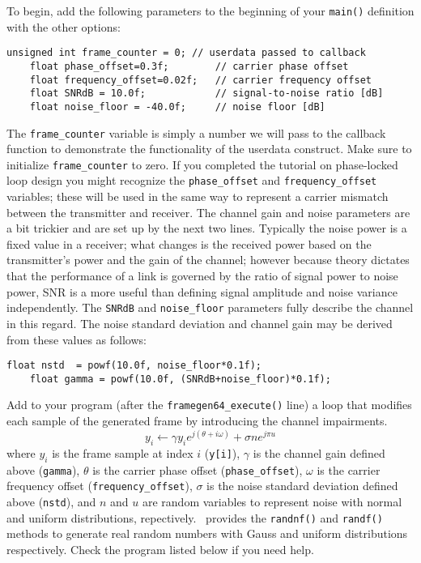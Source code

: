 To begin, add the following parameters to the beginning of your
{\tt main()} definition with the other options:
%
\begin{Verbatim}[fontsize=\small]
    unsigned int frame_counter = 0; // userdata passed to callback
    float phase_offset=0.3f;        // carrier phase offset
    float frequency_offset=0.02f;   // carrier frequency offset
    float SNRdB = 10.0f;            // signal-to-noise ratio [dB]
    float noise_floor = -40.0f;     // noise floor [dB]
\end{Verbatim}
%
The {\tt frame\_counter} variable is simply a number we will pass to the
callback function to demonstrate the functionality of the userdata
construct.
Make sure to initialize {\tt frame\_counter} to zero.
%
If you completed the tutorial on phase-locked loop design you might
recognize the {\tt phase\_offset} and {\tt frequency\_offset} variables;
these will be used in the same way to represent a carrier mismatch
between the transmitter and receiver.
%
The channel gain and noise parameters are a bit trickier and are set up
by the next two lines.
Typically the noise power is a fixed value in a receiver;
what changes is the received power based on the transmitter's power and
the gain of the channel;
however because theory dictates that the performance of a link is
governed by the ratio of signal power to noise power,
SNR is a more useful than defining signal amplitude and noise variance
independently.
The {\tt SNRdB} and {\tt noise\_floor} parameters fully describe the
channel in this regard.
The noise standard deviation and channel gain may be derived from these
values as follows:
%
\begin{Verbatim}[fontsize=\small]
    float nstd  = powf(10.0f, noise_floor*0.1f);
    float gamma = powf(10.0f, (SNRdB+noise_floor)*0.1f);
\end{Verbatim}
%
Add to your program
(after the {\tt framegen64\_execute()} line)
a loop that modifies each sample of the generated frame by introducing
the channel impairments.
%
\[
    y_i \leftarrow \gamma y_i e^{j(\theta + i\omega)} + \sigma n e^{j \pi u}
\]
%
where
$y_i$ is the frame sample at index $i$ ({\tt y[i]}),
$\gamma$ is the channel gain defined above ({\tt gamma}),
$\theta$ is the carrier phase offset ({\tt phase\_offset}),
$\omega$ is the carrier frequency offset ({\tt frequency\_offset}),
$\sigma$ is the noise standard deviation defined above ({\tt nstd}), and
$n$ and $u$ are random variables to represent noise with
normal and uniform distributions, repectively.
\liquid\ provides the {\tt randnf()} and {\tt randf()} methods to
generate real random numbers with Gauss and uniform distributions
respectively.
Check the program listed below if you need help.

